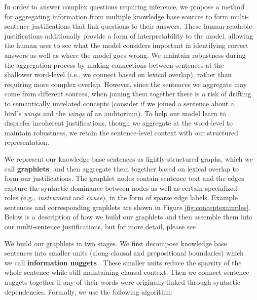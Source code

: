 In order to answer complex questions requiring inference, we propose a method for aggregating information from multiple knowledge base sources to form multi-sentence justifications that link questions to their answers.  These human-readable justifications additionally provide a form of interpretability to the model, allowing the human user to see what the model considers important in identifying correct answers as well as where the model goes wrong.  We maintain robustness during the aggregation process by making connections between sentences at the shallower word-level (i.e., we connect based on lexical overlap), rather than requiring more complex overlap.  However, since the sentences we aggregate may come from different sources, when joining them together there is a risk of drifting to semantically unrelated concepts (consider if we joined a sentence about a bird's \textit{wings} and the \textit{wings} of an auditorium).  To help our model learn to disprefer incoherent justifications, though we aggregate at the word-level to maintain robustness, we retain the sentence-level context with our structured representation. 

We represent our knowledge base sentences as lightly-structured graphs, which we call \textbf{graphlets}, and then aggregate them together based on lexical overlap to form our justifications.  The graphlet nodes contain sentence text and the edges capture the syntactic dominance between nodes as well as certain specialized roles (e.g., \emph{instrument} and \emph{cause}), in the form of sparse edge labels.  Example sentences and corresponding graphlets are shown in Figure \ref{fig:conceptexamples}.  Below is a description of how we build our graphlets and then assemble them into our multi-sentence justifications, but for more detail, please see \citet{jansen2017framing}.

We build our graphlets in two stages.  We first decompose knowledge base sentences into smaller units (along clausal and prepositional boundaries) which we call \textbf{information nuggets} \citep{Voorhees:2003}.  These smaller units reduce the sparsity of the whole sentence while still maintaining clausal context.  Then we connect sentence nuggets together if any of their words were originally linked through syntactic dependencies.  Formally, we use the following algorithm:

